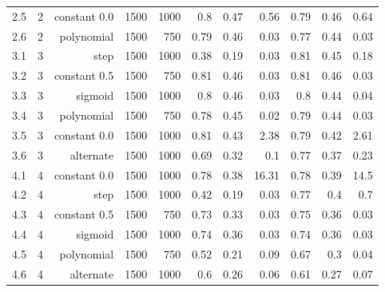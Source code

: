 \begin{table}[]
{\begin{tabular}{rrrrrrrrrrr}
          2.5                  & 2                    & constant 0.0         & 1500           & 1000    & 0.8   & 0.47 & 0.56  & 0.79 & 0.46 & 0.64  \\
          2.6                  & 2                    & polynomial           & 1500           & 750     & 0.79  & 0.46 & 0.03  & 0.77 & 0.44 & 0.03  \\
          \hline
          3.1                  & 3                    & step                 & 1500           & 1000    & 0.38  & 0.19 & 0.03  & 0.81 & 0.45 & 0.18  \\
          3.2                  & 3                    & constant 0.5         & 1500           & 750     & 0.81  & 0.46 & 0.03  & 0.81 & 0.46 & 0.03  \\
          3.3                  & 3                    & sigmoid              & 1500           & 1000    & 0.8   & 0.46 & 0.03  & 0.8  & 0.44 & 0.04  \\
          3.4                  & 3                    & polynomial           & 1500           & 750     & 0.78  & 0.45 & 0.02  & 0.79 & 0.44 & 0.03  \\
          3.5                  & 3                    & constant 0.0         & 1500           & 1000    & 0.81  & 0.43 & 2.38  & 0.79 & 0.42 & 2.61  \\
          3.6                  & 3                    & alternate            & 1500           & 1000    & 0.69  & 0.32 & 0.1   & 0.77 & 0.37 & 0.23  \\
          \hline
          4.1                  & 4                    & constant 0.0         & 1500           & 1000    & 0.78  & 0.38 & 16.31 & 0.78 & 0.39 & 14.5  \\
          4.2                  & 4                    & step                 & 1500           & 1000    & 0.42  & 0.19 & 0.03  & 0.77 & 0.4  & 0.7   \\
          4.3                  & 4                    & constant 0.5         & 1500           & 750     & 0.73  & 0.33 & 0.03  & 0.75 & 0.36 & 0.03  \\
          4.4                  & 4                    & sigmoid              & 1500           & 1000    & 0.74  & 0.36 & 0.03  & 0.74 & 0.36 & 0.03  \\
          4.5                  & 4                    & polynomial           & 1500           & 750     & 0.52  & 0.21 & 0.09  & 0.67 & 0.3  & 0.04  \\
          4.6                  & 4                    & alternate            & 1500           & 1000    & 0.6   & 0.26 & 0.06  & 0.61 & 0.27 & 0.07  \\

\end{tabular}}
\end{table}
